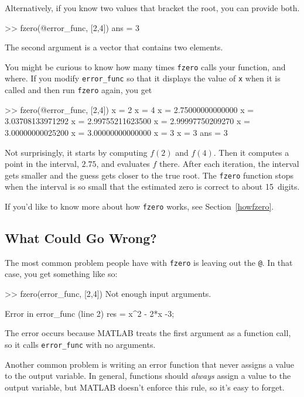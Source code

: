 Alternatively, if you know two values that bracket the root,
you can provide both.

\begin{code}
>> fzero(@error_func, [2,4])
ans = 3
\end{code}

The second argument is a vector that contains two elements.


You might be curious to know how many times \lstinline{fzero} calls your
function, and where.  If you modify \lstinline{error_func} so that it displays
the value of \lstinline{x} when it is called and then run \lstinline{fzero}
again, you get

\begin{code}
>> fzero(@error_func, [2,4])
x = 2
x = 4
x = 2.75000000000000
x = 3.03708133971292
x = 2.99755211623500
x = 2.99997750209270
x = 3.00000000025200
x = 3.00000000000000
x = 3
x = 3
ans = 3
\end{code}

Not surprisingly, it starts by computing $f(2)$ and $f(4)$.  Then it computes a point in the interval, $2.75$, and evaluates $f$ there.  After each iteration, the interval gets smaller and the guess gets closer to the true root.
The \lstinline{fzero} function stops when the interval is so small that the estimated
zero is correct to about 15~digits.

If you'd like to know more about how \lstinline{fzero} works, see Section~\ref{howfzero}.


\subsection{What Could Go Wrong?}

The most common problem people have with \lstinline{fzero} is leaving
out the \lstinline{@}.  In that case, you get something like so:

\begin{code}
>> fzero(error_func, [2,4])
Not enough input arguments.

Error in error_func (line 2)
    res = x^2 - 2*x -3;
\end{code}

The error occurs because MATLAB treats the first argument as a function call, so it calls \lstinline{error_func} with no arguments.


Another common problem is writing an error function that never
assigns a value to the output variable.  In general, functions should
\emph{always} assign a value to the output variable, but MATLAB doesn't
enforce this rule, so it's easy to forget.


